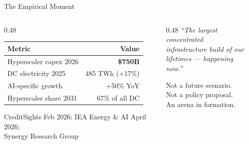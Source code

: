 \documentclass[aspectratio=169,12pt]{beamer}
\begin{document}
\begin{frame}{The Empirical Moment}
\begin{columns}[T]
\begin{column}{0.48\textwidth}
  \begin{tabular}{@{}lr@{}}
    \toprule
    \textbf{Metric} & \textbf{Value} \\
    \midrule
    Hyperscaler capex 2026  & \textbf{\$750B} \\
    DC electricity 2025     & 485 TWh (+17\%) \\
    AI-specific growth      & +50\% YoY \\
    Hyperscaler share 2031  & 67\% of all DC \\
    \bottomrule
  \end{tabular}
  \vspace{0.8em}

  \footnotesize\textcolor{tufteRule}{%
  CreditSights Feb 2026; IEA Energy \& AI April 2026;\\
  Synergy Research Group}
\end{column}
\begin{column}{0.48\textwidth}
  \vspace{0.3em}
  \large\textit{``The largest concentrated\\
  infrastructure build of our\\
  lifetimes — happening now.''}

  \vspace{0.8em}
  \normalsize
  Not a future scenario.\\
  Not a policy proposal.\\[0.3em]
  \alert{An arena in formation.}
\end{column}
\end{columns}
\end{frame}
\end{document}
